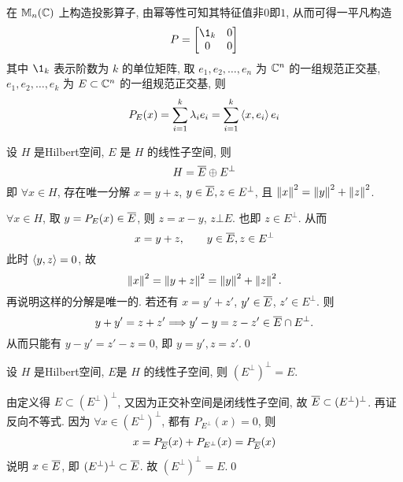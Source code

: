         \begin{Example}
            在 $ \mathbb{M}_{n}(\C) $ 上构造投影算子, 由幂等性可知其特征值非$0$即$1$, 从而可得一平凡构造
            \[
                P=\begin{bmatrix}
                    \1_{k} & 0 \\
                    0 & 0
                \end{bmatrix}
            \]
            其中 $ \1_{k} $ 表示阶数为 $ k $ 的单位矩阵, 取 $ e_{1}, e_{2},\dots,e_{n} $ 为 $ \C^{n} $ 的一组规范正交基, $ e_{1}, e_{2},\dots,e_{k} $ 为 $ E\subset\C^{n} $ 的一组规范正交基, 则
            \[
                P_{E}(x)=\sum_{i=1}^{k}\lambda_{i}e_{i}=\sum_{i=1}^{k}\lrangle{x, e_{i}}e_{i}
            \]
        \end{Example}

    \begin{Corollary}[正交分解]
        设 $ H $ 是Hilbert空间, $ E $ 是 $ H $ 的线性子空间, 则
        \[
            H=\baro{E}\oplus E^{\bot}
        \]
        即 $ \forall x\in H $, 存在唯一分解 $ x=y+z $, $ y\in\baro{E}, z\in E^{\bot} $, 且 $ \norm{x}^{2}=\norm{y}^{2}+\norm{z}^{2} $.
    \end{Corollary}

    \begin{Proof}
        $ \forall x\in H $, 取 $ y=P_{E}(x)\in \baro{E} $, 则 $ z=x-y $, $ z\bot E $. 也即 $ z\in E^{\bot} $. 从而
        \[
            x=y+z, \qquad y\in \baro{E}, z\in E^{\bot}
        \]
        此时 $ \lrangle{y, z}=0 $, 故
        \[
            \norm{x}^{2}=\norm{y+z}^{2}=\norm{y}^{2}+\norm{z}^{2}.        
        \]
        再说明这样的分解是唯一的. 若还有 $ x=y'+z' $, $ y'\in\baro{E} $, $ z'\in E^{\bot} $. 则
        \[
            y+y'=z+z' \Longrightarrow y'-y=z-z'\in \baro{E}\cap E^{\bot}.
        \]
        从而只能有 $ y-y'=z'-z=0 $, 即 $ y=y', z=z' $.\qed
    \end{Proof}

    \begin{Corollary}
        设 $ H $ 是Hilbert空间, $ E $是 $ H $ 的线性子空间, 则 $ (E^{\bot})^{\bot}=E $.
    \end{Corollary}

    \begin{Proof}
        由定义得 $ E\subset (E^{\bot})^{\bot} $, 又因为正交补空间是闭线性子空间, 故 $ \baro{E}\subset (E^{\bot})^{\bot} $. 再证反向不等式. 因为 $ \forall x\in(E^{\bot})^{\bot}  $, 都有 $ P_{E^{\bot}}(x)=0 $, 则
        \[
            x=P_{\baro{E}}(x)+P_{E^{\bot}}(x)=P_{\baro{E}}(x)
        \]
        说明 $ x\in\baro{E} $, 即 $ (E^{\bot})^{\bot}\subset \baro{E} $. 故 $ (E^{\bot})^{\bot}=E $.\qed
    \end{Proof}


